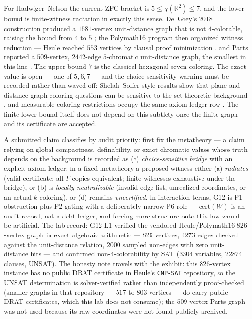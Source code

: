 \documentclass[11pt]{article}
\theoremstyle{definition}
\begin{document}
For Hadwiger--Nelson the current ZFC bracket is $5 \le \chi(\mathbb{R}^2) \le 7$, and the lower bound
is finite-witness radiation in exactly this sense. De~Grey's 2018 construction produced a
$1581$-vertex unit-distance graph that is not $4$-colorable, raising the bound from $4$ to $5$
\citep{DeGrey2018}; the Polymath16 program then organized witness reduction --- Heule reached
$553$ vertices by clausal proof minimization \citep{Heule2018}, and Parts reported a $509$-vertex,
$2442$-edge $5$-chromatic unit-distance graph, the smallest in this line \citep{Parts2020}. The
upper bound $7$ is the classical hexagonal seven-coloring. The exact value is open --- one of $5, 6,
7$ --- and the choice-sensitivity warning must be recorded rather than waved off: Shelah--Soifer-style
results show that plane and distance-graph coloring questions can be sensitive to the set-theoretic
background \citep{ShelahSoifer2003}, and measurable-coloring restrictions occupy the same axiom-ledger
row \citep{Falconer1981}. The finite lower bound itself does not depend on this subtlety once the
finite graph and its certificate are accepted.

A submitted claim classifies by audit priority: first fix the metatheory --- a claim relying on
global compactness, definability, or exact chromatic values whose truth depends on the background is
recorded as (c) \emph{choice-sensitive bridge} with an explicit axiom ledger; in a fixed metatheory a
proposed witness either (a) \emph{radiates} (valid certificate; all $\Gamma$-copies equivalent;
finite witnesses exhaustive under the bridge), or (b) is \emph{locally neutralizable} (invalid edge
list, unrealized coordinates, or an actual $k$-coloring), or (d) remains \emph{uncertified}. In
interaction terms, G12 is P1 obstruction plus P2 gating with a deliberately narrow P6 role ---
$\mathrm{cert}(W)$ is an audit record, not a debt ledger, and forcing more structure onto this law
would be artificial. The lab record: G12-L1 verified the vendored Heule/Polymath16 $826$-vertex graph
in exact algebraic arithmetic --- $826$ vertices, $4273$ edges checked against the unit-distance
relation, $2000$ sampled non-edges with zero unit-distance hits --- and confirmed non-$4$-colorability
by SAT ($3304$ variables, $22874$ clauses, UNSAT). The honesty note travels with the exhibit: this
$826$-vertex instance has no public DRAT certificate in Heule's \texttt{CNP-SAT} repository, so the
UNSAT determination is solver-verified rather than independently proof-checked (smaller graphs in
that repository --- $517$ to $803$ vertices --- do carry public DRAT certificates, which this lab
does not consume); the $509$-vertex Parts graph was not used because its raw coordinates were not
found publicly archived.
\end{document}

